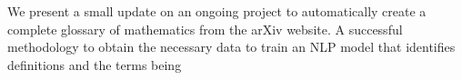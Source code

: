 We present a small update on an ongoing project to automatically create a complete glossary of mathematics from the arXiv website. 
A successful methodology to obtain the necessary data to train an NLP model that identifies definitions and the terms being 
